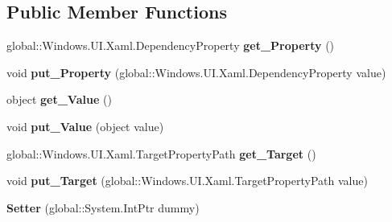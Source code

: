 \subsection*{Public Member Functions}
\begin{DoxyCompactItemize}
\item 
\mbox{\label{class_windows_1_1_u_i_1_1_xaml_1_1_setter_a686887dcaf21b9a12cd491564e78b429}} 
global\+::\+Windows.\+U\+I.\+Xaml.\+Dependency\+Property {\bfseries get\+\_\+\+Property} ()
\item 
\mbox{\label{class_windows_1_1_u_i_1_1_xaml_1_1_setter_ab6f14c994bdff627cc05c2de84c4e918}} 
void {\bfseries put\+\_\+\+Property} (global\+::\+Windows.\+U\+I.\+Xaml.\+Dependency\+Property value)
\item 
\mbox{\label{class_windows_1_1_u_i_1_1_xaml_1_1_setter_a36e13b544319d51446f95fa1d4f99345}} 
object {\bfseries get\+\_\+\+Value} ()
\item 
\mbox{\label{class_windows_1_1_u_i_1_1_xaml_1_1_setter_aa1b1137b1463b4c0fcf2698f1ef38332}} 
void {\bfseries put\+\_\+\+Value} (object value)
\item 
\mbox{\label{class_windows_1_1_u_i_1_1_xaml_1_1_setter_a354e09225c55d9bc08796200969e6dbc}} 
global\+::\+Windows.\+U\+I.\+Xaml.\+Target\+Property\+Path {\bfseries get\+\_\+\+Target} ()
\item 
\mbox{\label{class_windows_1_1_u_i_1_1_xaml_1_1_setter_a625ef62aa1e630e8cfe82e287e278cb2}} 
void {\bfseries put\+\_\+\+Target} (global\+::\+Windows.\+U\+I.\+Xaml.\+Target\+Property\+Path value)
\item 
\mbox{\label{class_windows_1_1_u_i_1_1_xaml_1_1_setter_a8afe01be4ca04014f678f20627344902}} 
{\bfseries Setter} (global\+::\+System.\+Int\+Ptr dummy)
\item 
\mbox{\label{class_windows_1_1_u_i_1_1_xaml_1_1_setter_a686887dcaf21b9a12cd491564e78b429}} 

\end{DoxyCompactItemize}
